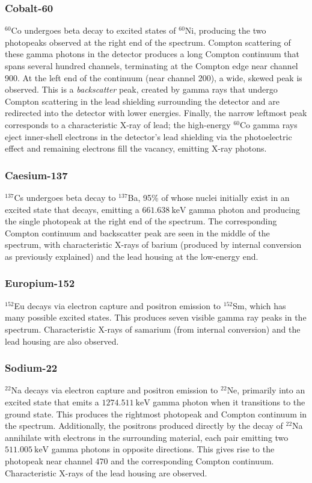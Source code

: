 \documentclass[twocol]{ametsocV6.1}
\begin{document}
\subsubsection{Cobalt-60}
$^{60}$Co undergoes beta decay to excited states of $^{60}$Ni, producing
the two photopeaks observed at the right end of the spectrum. Compton
scattering of these gamma photons in the detector produces a long
Compton continuum that spans several hundred channels, terminating at
the Compton edge near channel 900. At the left end of the continuum
(near channel 200), a wide, skewed peak is observed. This is a
\emph{backscatter} peak, created by gamma rays that undergo Compton
scattering in the lead shielding surrounding the detector and are
redirected into the detector with lower energies. Finally, the narrow
leftmost peak corresponds to a characteristic X-ray of lead; the high-energy
$^{60}$Co gamma rays eject inner-shell electrons in the detector's lead
shielding via the photoelectric effect and remaining electrons fill the
vacancy, emitting X-ray photons.

\subsubsection{Caesium-137}
$^{137}$Cs undergoes beta decay to $^{137}$Ba, 95\% of whose nuclei initially
exist in an excited state that decays, emitting a 
$\SI{661.638}{\kilo\electronvolt}$ gamma photon and producing the single
photopeak at the right end of the spectrum. The corresponding Compton continuum
and backscatter peak are seen in the middle of the spectrum, with
characteristic X-rays of barium (produced by internal conversion as previously
explained) and the lead housing at the low-energy end.

\subsubsection{Europium-152}
$^{152}$Eu decays via electron capture and positron emission to $^{152}$Sm,
which has many possible excited states. This produces seven visible gamma ray
peaks in the spectrum. Characteristic X-rays of samarium
(from internal conversion) and the lead housing are also observed.

\subsubsection{Sodium-22}
$^{22}$Na decays via electron capture and positron emission to $^{22}$Ne,
primarily into an excited state that emits a
$\SI{1274.511}{\kilo\electronvolt}$ gamma photon when it transitions to
the ground state. This produces the rightmost photopeak and Compton
continuum in the spectrum. Additionally, the positrons produced directly
by the decay of $^{22}$Na annihilate with electrons in the surrounding
material, each pair emitting two $\SI{511.005}{\kilo\electronvolt}$
gamma photons in opposite directions. This gives rise to the photopeak
near channel 470 and the corresponding Compton continuum. Characteristic
X-rays of the lead housing are observed.
\end{document}
